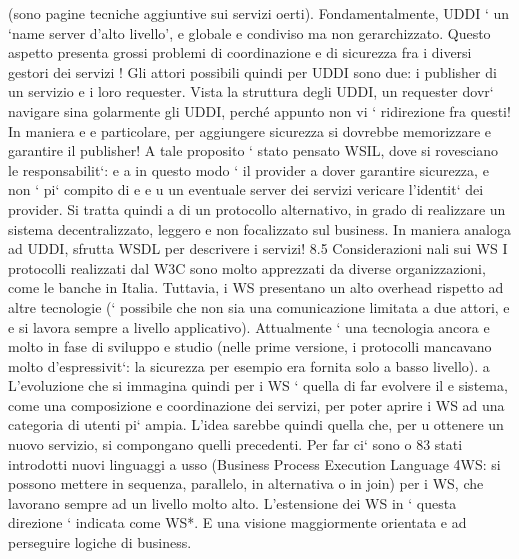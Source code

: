 \documentclass[a4paper,12pt]{article}
\begin{document}
(sono pagine tecniche aggiuntive
sui servizi oerti). Fondamentalmente, UDDI ` un {`}name server d'alto livello',
e
globale e condiviso ma non gerarchizzato. Questo aspetto presenta grossi problemi di coordinazione e di sicurezza fra i
diversi gestori dei servizi !
Gli attori possibili quindi per UDDI sono due: i publisher di un servizio e i
loro requester. Vista la struttura degli UDDI, un requester dovr` navigare sina
golarmente gli UDDI, perché appunto non vi ` ridirezione fra questi! In maniera
e
e
particolare, per aggiungere sicurezza si dovrebbe memorizzare e garantire il publisher!
A tale proposito ` stato pensato WSIL, dove si rovesciano le responsabilit`:
e
a
in questo modo ` il provider a dover garantire sicurezza, e non ` pi` compito di
e
e u
un eventuale server dei servizi vericare l'identit` dei provider. Si tratta quindi
a
di un protocollo alternativo, in grado di realizzare un sistema decentralizzato,
leggero e non focalizzato sul business. In maniera analoga ad UDDI, sfrutta
WSDL per descrivere i servizi!
8.5
Considerazioni nali sui WS
I protocolli realizzati dal W3C sono molto apprezzati da diverse organizzazioni,
come le banche in Italia. Tuttavia, i WS presentano un alto overhead rispetto ad
altre tecnologie (` possibile che non sia una comunicazione limitata a due attori,
e
e si lavora sempre a livello applicativo). Attualmente ` una tecnologia ancora
e
molto in fase di sviluppo e studio (nelle prime versione, i protocolli mancavano
molto d'espressivit`: la sicurezza per esempio era fornita solo a basso livello).
a
L'evoluzione che si immagina quindi per i WS ` quella di far evolvere il
e
sistema, come una composizione e coordinazione dei servizi, per poter aprire i
WS ad una categoria di utenti pi` ampia. L'idea sarebbe quindi quella che, per
u
ottenere un nuovo servizio, si compongano quelli precedenti. Per far ci` sono
o
83
stati introdotti nuovi linguaggi a usso (Business Process Execution Language
4WS: si possono mettere in sequenza, parallelo, in alternativa o in join) per
i WS, che lavorano sempre ad un livello molto alto. L'estensione dei WS in
`
questa direzione ` indicata come WS*. E una visione maggiormente orientata
e
ad perseguire logiche di business.
\end{document}
